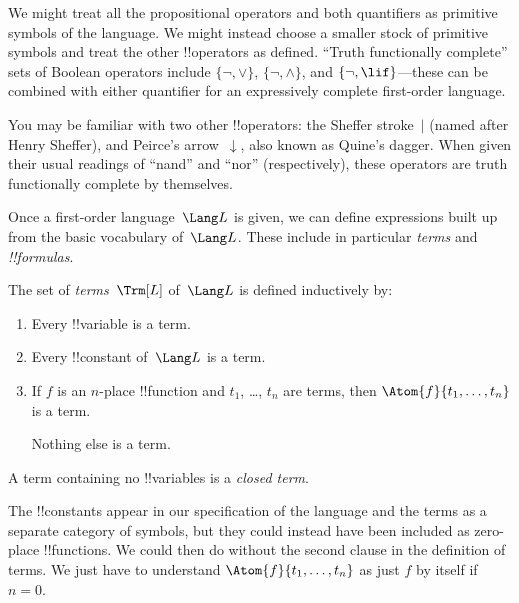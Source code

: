 \begin{explain}
We might treat all the propositional operators and both quantifiers as
primitive symbols of the language.  We might instead choose a smaller
stock of primitive symbols and treat the other !!{operator}s as
defined. ``Truth functionally complete'' sets of Boolean operators
include $\{ \lnot, \lor \}$, $\{ \lnot, \land \}$, and $\{ \lnot,
\lif\}$---these can be combined with either quantifier for an
expressively complete first-order language.

You may be familiar with two other !!{operator}s: the Sheffer
stroke~$|$ (named after Henry Sheffer), and Peirce's
arrow~$\downarrow$, also known as Quine's dagger.  When given their
usual readings of ``nand'' and ``nor'' (respectively), these operators
are truth functionally complete by themselves.
\end{explain}







Once a first-order language~$\Lang L$ is given, we can define
expressions built up from the basic vocabulary of~$\Lang L$.  These
include in particular \emph{terms} and \emph{!!{formula}s}.

\begin{defn}[Terms]
The set of \emph{terms}~$\Trm[L]$ of~$\Lang L$ is
defined inductively by:
\begin{enumerate}
\item Every !!{variable} is a term.
\item Every !!{constant} of~$\Lang L$ is a term.
\item If $f$ is an $n$-place !!{function} and $t_1$, \dots, $t_n$
  are terms, then $\Atom{f}{t_1, \ldots, t_n}$ is a term.

  Nothing else is a term.
\end{enumerate}
A term containing no !!{variable}s is a \emph{closed term}.
\end{defn}

\begin{explain}
The !!{constant}s appear in our specification of the language and the
terms as a separate category of symbols, but they could instead have
been included as zero-place !!{function}s.  We could then do without
the second clause in the definition of terms. We just have to
understand $\Atom{f}{t_1, \ldots, t_n}$ as just $f$ by itself if $n =
0$.
\end{explain}

